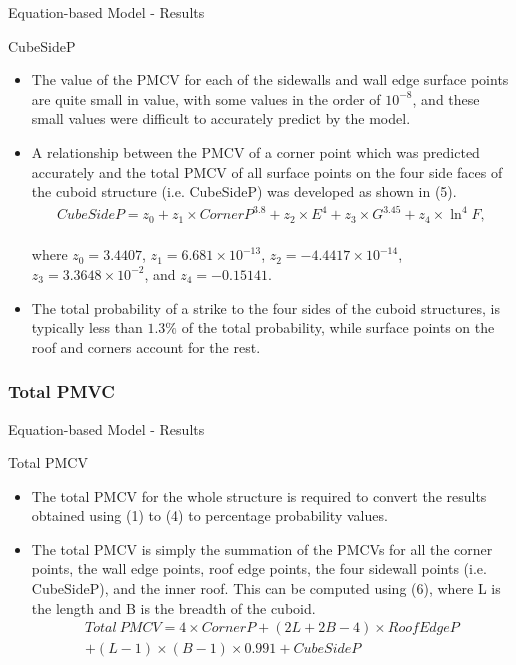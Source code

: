 \documentclass{beamer}
\begin{document}
\begin{frame}{Equation-based Model - Results}
    \begin{block}{CubeSideP}
    \begin{itemize}\justifying
        \item The value of the PMCV for each of the sidewalls and wall edge surface points are quite small in value, with some values in the order of $10^{-8}$, and these small values were difficult to accurately predict by the model.
        \item A relationship between the PMCV of a corner point which was predicted accurately and the total PMCV of all surface points on the four side faces of the cuboid structure (i.e. CubeSideP) was developed as shown in (5).
        \vspace{-7.5mm}\begin{multline}
            CubeSideP = z_0\! +\! z_1\! \times\! CornerP^{3.8}\! +\! z_2 \!\times\! E^{4}\! +\! z_3\! \times\! G^{3.45}\! +\! z_4\! \times\! \ln^4 F,
        \end{multline}\\\vspace{-1.5mm}
        where $z_0 = 3.4407$, $z_1 = 6.681 \times 10^{-13}$, $z_2= -4.4417 \times 10^{-14}$, $z_3 = 3.3648 \times 10^{-2}$, and $z_4= -0.15141$.
        \item The total probability of a strike to the four sides of the cuboid structures, is typically less than $1.3\%$ of the total probability, while surface points on the roof and corners account for the rest.
    \end{itemize}
    \end{block}
\end{frame}

\subsubsection{Total PMVC}
\begin{frame}{Equation-based Model - Results}
    \begin{block}{Total PMCV}
    \begin{itemize}\justifying
        \item The total PMCV for the whole structure is required to convert the results obtained using (1) to (4) to percentage probability values.
        \item The total PMCV is simply the summation of the PMCVs for all the corner points, the wall edge points, roof edge points, the four sidewall points (i.e. CubeSideP), and the inner roof. This can be computed using (6), where L is the length and B is the breadth of the cuboid.
        \vspace{-4mm}\begin{multline}
            Total\ PMCV =  4 \times CornerP+(2L + 2B-4) \times RoofEdgeP\\+ (L-1)\times(B-1)\times 0.991 + CubeSideP
        \end{multline}\\\vspace{-3mm}
    \end{itemize}
    \end{block}
\end{frame}
\end{document}

